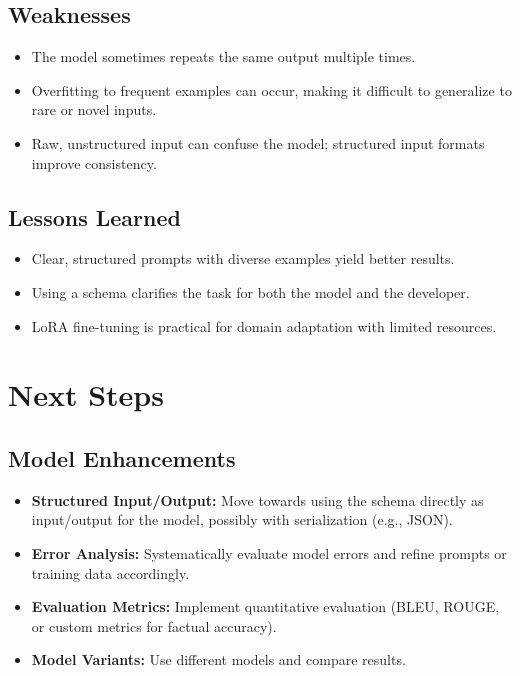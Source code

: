 \documentclass[fleqn,moreauthors,10pt]{ds_report}
\begin{document}
\subsection*{Weaknesses}
\begin{itemize}
    \item The model sometimes repeats the same output multiple times.
    \item Overfitting to frequent examples can occur, making it difficult to generalize to rare or novel inputs.
    \item Raw, unstructured input can confuse the model; structured input formats improve consistency.
\end{itemize}

\subsection*{Lessons Learned}
\begin{itemize}
    \item Clear, structured prompts with diverse examples yield better results.
    \item Using a schema clarifies the task for both the model and the developer.
    \item LoRA fine-tuning is practical for domain adaptation with limited resources.
\end{itemize}

\section*{Next Steps}

\subsection*{Model Enhancements}
\begin{itemize}
    \item \textbf{Structured Input/Output:} Move towards using the schema directly as input/output for the model, possibly with serialization (e.g., JSON).
    \item \textbf{Error Analysis:} Systematically evaluate model errors and refine prompts or training data accordingly.
    \item \textbf{Evaluation Metrics:} Implement quantitative evaluation (BLEU, ROUGE, or custom metrics for factual accuracy).
    \item \textbf{Model Variants:} Use different models and compare results.
\end{itemize}
\end{document}
